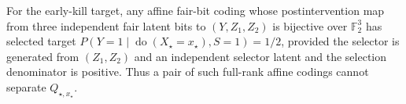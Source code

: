 For the early-kill target, any affine fair-bit coding whose postintervention map from three independent fair latent bits to \((Y,Z_1,Z_2)\) is bijective over \(\mathbb F_2^3\) has selected target \(P(Y=1\mid\operatorname{do}(X_\star=x_\star),S=1)=1/2\), provided the selector is generated from \((Z_1,Z_2)\) and an independent selector latent and the selection denominator is positive. Thus a pair of such full-rank affine codings cannot separate \(Q_{\star,x_\star}\).